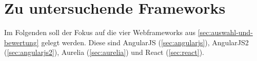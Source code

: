 \section{Zu untersuchende Frameworks}

Im Folgenden soll der Fokus auf die vier Webframeworks aus \autoref{sec:auswahl-und-bewertung} gelegt werden. Diese sind AngularJS (\autoref{sec:angularjs}),  AngularJS2 (\autoref{sec:angularjs2}), Aurelia (\autoref{sec:aurelia}) und React (\autoref{sec:react}).
